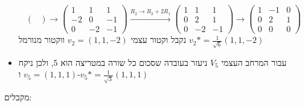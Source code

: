 \documentclass{article}
\begin{document}
\begin{itemize}
\[\begin{pmatrix}
              \end{pmatrix}\rightarrow
              \begin{pmatrix}
                  1  & 1  & 1  \\
                  -2 & 0  & -1 \\
                  0  & -2 & -1
              \end{pmatrix} \xrightarrow[]{R_2\rightarrow R_2+2R_1}
              \begin{pmatrix}
                  1 & 1  & 1  \\
                  0 & 2  & 1  \\
                  0 & -2 & -1
              \end{pmatrix} \rightarrow
              \begin{pmatrix}
                  1 & -1 & 0 \\
                  0 & 2  & 1 \\
                  0 & 0  & 0
              \end{pmatrix}
          \]
          נקבל וקטור עצמי $v_2=(1, 1, -2)$ ווקטור מנורמל $v_2*=\frac{1}{\sqrt{6}}(1, 1, -2)$
    \item עבור המרחב העצמי $V_5$ ניעזר בעובדה שסכום כל שורה במטריצה הוא 5, ולכן ניקח $v_5=(1,1,1)$ ו-$v_5*=\frac{1}{\sqrt{3}}(1,1,1)$
\end{itemize}
מקבלים:
\end{document}
